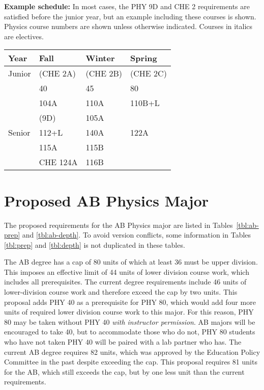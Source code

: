 \documentclass[12pt]{article}
\begin{document}
\noindent
{\bf Example schedule:} In most cases, the PHY 9D and CHE 2 requirements are
satisfied before the junior year, but an example including these courses is
shown.  Physics course numbers are shown unless otherwise indicated.
Courses in italics are electives.
\begin{center}
\begin{tabular}{|l|l|l|l|}
\hline
Year      & Fall    & Winter & Spring \\
\hline
Junior    & (CHE 2A)   & (CHE 2B)     & (CHE 2C) \\
          & 40         & 45           & 80 \\
          & 104A       & 110A         & 110B+L \\
          & (9D)       & 105A         & \\

\hline
Senior   & 112+L         & 140A       & 122A\\
         & 115A          & 115B       &  \\
         & CHE 124A      & 116B       &  \\
\hline
\end{tabular}
\end{center}

\section{Proposed AB Physics Major}
\label{sec:ab}

The proposed requirements for the AB Physics major are listed in
Tables~\ref{tbl:ab-prep} and \ref{tbl:ab-depth}.  To avoid version
conflicts, some information in Tables \ref{tbl:prep} and
\ref{tbl:depth} is not duplicated in these tables.

The AB degree has a cap of 80 units of which at least 36 must be upper
division.  This imposes an effective limit of 44 units of lower
division course work, which includes all prerequisites.  The current
degree requirements include 46 units of lower-division course work and
therefore exceed the cap by two units.  This proposal adds PHY 40 as a
prerequisite for PHY 80, which would add four more units of required
lower division course work to this major.  For this reason, PHY 80 may
be taken without PHY 40 {\em with instructor permission}.  AB majors
will be encouraged to take 40, but to accommodate those who do not,
PHY 80 students who have not taken PHY 40 will be paired with a lab
partner who has.  The current AB degree requires 82 units, which was
approved by the Education Policy Committee in the past despite
exceeding the cap.  This proposal requires 81 units for the AB, which
still exceeds the cap, but by one less unit than the current
requirements.
\end{document}
